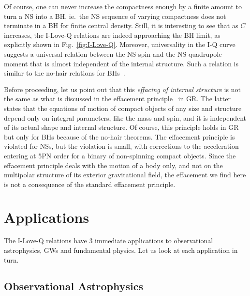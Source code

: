 \documentclass[aps,twocolumn,nofootinbib,showpacs,superscriptaddress,hyperref]{revtex4-1}
\begin{document}
Of course, one can never increase the compactness enough by a finite amount to turn a NS into a BH, ie.~the NS sequence of varying compactness does not terminate in a BH for finite central density.  Still, it is interesting to see that as $C$ increases, the I-Love-Q relations are indeed approaching the BH limit, as explicitly shown in Fig.~\ref{fig:I-Love-Q}. Moreover, universality in the I-Q curve suggests a universal relation between the NS spin and the NS quadrupole moment that is almost independent of the internal structure. Such a relation is similar to the no-hair relations for BHs~\cite{geroch,hansen}.

Before proceeding, let us point out that this {\emph{effacing of internal structure}} is not the same as what is discussed in the effacement principle~\cite{damour-effacement} in GR. The latter states that the equations of motion of compact objects of any size and structure depend only on integral parameters, like the mass and spin, and it is independent of its actual shape and internal structure. Of course, this principle holds in GR but only for BHs because of the no-hair theorems. The effacement principle is violated for NSs, but the violation is small, with corrections to the acceleration entering at 5PN order for a binary of non-spinning compact objects. Since the effacement principle deals with the motion of a body only, and not on the multipolar structure of its exterior gravitational field, the effacement we find here is not a consequence of the standard effacement principle. 

\section{Applications}
\label{sec:applications}

The I-Love-Q relations have 3 immediate applications to observational astrophysics, GWs and fundamental physics. Let us look at each application in turn. 


\subsection{Observational Astrophysics}
\end{document}
